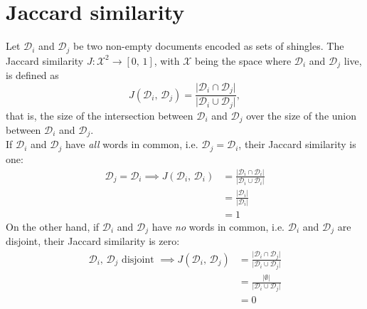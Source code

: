 \documentclass{article}
\begin{document}
  \section{Jaccard similarity}
  Let \( \mathcal D_i \) and \( \mathcal D_j \) be two non-empty documents
  encoded as sets of shingles. The Jaccard similarity
  \( J \! : \mathcal X^2 \to [ 0, \, 1 ] \), with \( \mathcal X \) being the
  space where \( \mathcal D_i \) and \( \mathcal D_j \) live, is defined as
  \[
    J ( \mathcal D_i, \, \mathcal D_j ) =
    \frac{ \lvert \mathcal D_i \cap \mathcal D_j \rvert }{ \lvert \mathcal D_i \cup \mathcal D_j \rvert } \mathrm ,
  \]
  that is, the size of the intersection between \( \mathcal D_i \) and
  \( \mathcal D_j \) over the size of the union between \( \mathcal D_i \) and
  \( \mathcal D_j \). \\
  If \( \mathcal D_i \) and \( \mathcal D_j \) have \emph{all} words in common,
  i.e. \( \mathcal D_j = \mathcal D_i \), their Jaccard similarity is one:
  \begin{align*}
    \mathcal D_j = \mathcal D_i \implies J ( \mathcal D_i, \, \mathcal D_i )
    & = \frac{ \lvert \mathcal D_i \cap \mathcal D_i \rvert }{ \lvert \mathcal D_i \cup \mathcal D_i \rvert } \\
    & = \frac{ \lvert \mathcal D_i \rvert }{ \lvert \mathcal D_i \rvert } \\
    & = 1
  \end{align*}
  On the other hand, if \( \mathcal D_i \) and \( \mathcal D_j \) have
  \emph{no} words in common, i.e. \( \mathcal D_i \) and \( \mathcal D_j \) are
  disjoint, their Jaccard similarity is zero:
  \begin{align*}
    \mathcal D_i, \, \mathcal D_j \text{ disjoint } \implies
    J ( \mathcal D_i, \, \mathcal D_j )
    & = \frac{ \lvert \mathcal D_i \cap \mathcal D_j \rvert }{ \lvert \mathcal D_i \cup \mathcal D_j \rvert } \\
    & = \frac{ \lvert \emptyset \rvert }{ \lvert \mathcal D_i \cup \mathcal D_j \rvert } \\
    & = 0
  \end{align*}
\end{document}
